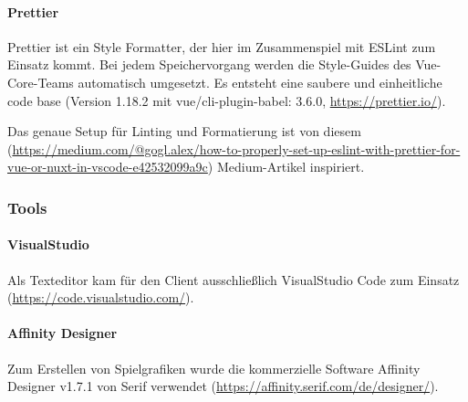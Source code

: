 	\paragraph{Prettier}
	Prettier ist ein Style Formatter, der hier im Zusammenspiel mit ESLint zum Einsatz kommt. Bei jedem Speichervorgang werden die Style-Guides des Vue-Core-Teams automatisch umgesetzt. Es entsteht eine saubere und einheitliche code base (Version 1.18.2 mit vue/cli-plugin-babel: 3.6.0, \url{https://prettier.io/}).

Das genaue Setup für Linting und Formatierung ist von diesem (\url{https://medium.com/@gogl.alex/how-to-properly-set-up-eslint-with-prettier-for-vue-or-nuxt-in-vscode-e42532099a9c}) Medium-Artikel inspiriert.


\subsubsection{Tools}

	\paragraph{VisualStudio}
Als Texteditor kam für den Client ausschließlich VisualStudio Code zum Einsatz (\url{https://code.visualstudio.com/}).

	\paragraph{Affinity Designer}
Zum Erstellen von Spielgrafiken wurde die kommerzielle Software Affinity Designer v1.7.1 von Serif verwendet (\url{https://affinity.serif.com/de/designer/}).



